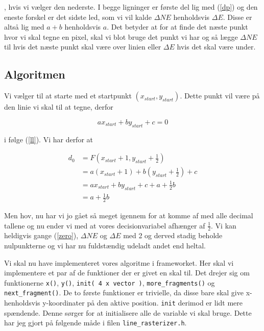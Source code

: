 \documentclass[a4paper, 10pt]{article}
\begin{document}
, hvis vi vælger den nederste.
I begge ligninger er første del lig med (\ref{dp}) og den eneste forskel er det sidste led, som vi vil kalde $\Delta NE$ henholdsvis $\Delta E$.
Disse er altså lig med $a + b$ henholdsvis $a$.
Det betyder at for at finde det næste punkt hvor vi skal tegne en pixel, skal vi blot bruge det punkt vi har og så lægge $\Delta NE$ til hvis det næste punkt skal være over linien eller $\Delta E$ hvis det skal være under.

\subsection{Algoritmen}
Vi vælger til at starte med et startpunkt $(x_{start}, y_{start})$.
Dette punkt vil være på den linie vi skal til at tegne, derfor 

\begin{equation}
ax_{start} + by_{start} + c = 0 \nonumber
\end{equation}

i følge (\ref{ll}).
Vi har derfor at

\begin{align}
d_0 &= F\left( x_{start} + 1, y_{start} + \frac{1}{2} \right) \nonumber\\
    &= a(x_{start} + 1) + b(y_{start} + \frac{1}{2}) + c \nonumber\\
    &= ax_{start} + by_{start} + c + a + \frac{1}{2}b \nonumber\\
    &= a + \frac{1}{2}b \label{zero}
\end{align}

Men hov, nu har vi jo gået så meget igennem for at komme af med alle decimal tallene og nu ender vi med at vores decisionvariabel afhænger af $\frac{1}{2}$.
Vi kan heldigvis gange (\ref{zero}), $\Delta NE$ og $\Delta E$ med 2 og derved stadig beholde nulpunkterne og vi har nu fuldstændig udeladt andet end heltal.

Vi skal nu have implementeret vores algoritme i frameworket.
Her skal vi implementere et par af de funktioner der er givet en skal til.
Det drejer sig om funktionerne \texttt{x()}, \texttt{y()}, \texttt{init( 4 x vector )}, \texttt{more\_fragments()} og \texttt{next\_fragment()}.
De to første funktioner er trivielle, da disse bare skal give x- henholdsvis y-koordinater på den aktive position.
\texttt{init} derimod er lidt mere spændende.
Denne sørger for at initialisere alle de variable vi skal bruge.
Dette har jeg gjort på følgende måde i filen \texttt{line\_rasterizer.h}.
\end{document}
